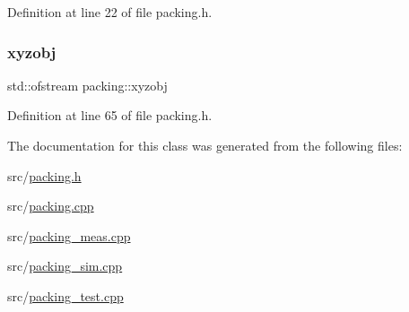 Definition at line 22 of file packing.\+h.

\mbox{\label{classpacking_a8c37b117034cced906a5232358752725}} 
\subsubsection{\texorpdfstring{xyzobj}{xyzobj}}
{\footnotesize\ttfamily std\+::ofstream packing\+::xyzobj\hspace{0.3cm}{\ttfamily [protected]}}



Definition at line 65 of file packing.\+h.



The documentation for this class was generated from the following files\+:\begin{DoxyCompactItemize}
\item 
src/\mbox{\hyperlink{packing_8h}{packing.\+h}}\item 
src/\mbox{\hyperlink{packing_8cpp}{packing.\+cpp}}\item 
src/\mbox{\hyperlink{packing__meas_8cpp}{packing\+\_\+meas.\+cpp}}\item 
src/\mbox{\hyperlink{packing__sim_8cpp}{packing\+\_\+sim.\+cpp}}\item 
src/\mbox{\hyperlink{packing__test_8cpp}{packing\+\_\+test.\+cpp}}\end{DoxyCompactItemize}
